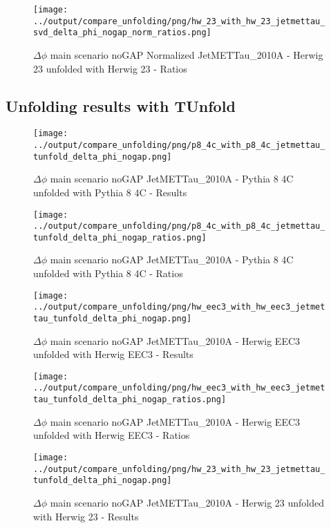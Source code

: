 \documentclass[11pt]{book}
\begin{document}
\begin{figure}[ht]
\centering
\texttt{[image: ../output/compare\_unfolding/png/hw\_23\_with\_hw\_23\_jetmettau\_svd\_delta\_phi\_nogap\_norm\_ratios.png]}
\caption{$\Delta\phi$ main scenario noGAP Normalized JetMETTau\_2010A - Herwig 23 unfolded with Herwig 23 - Ratios}
\label{hw_23_hw_23_jetmettau_svd_delta_phi_nogap_norm_b}
\end{figure}


\clearpage
\subsection{Unfolding results with TUnfold}

\begin{figure}[ht]
\centering
\texttt{[image: ../output/compare\_unfolding/png/p8\_4c\_with\_p8\_4c\_jetmettau\_tunfold\_delta\_phi\_nogap.png]}
\caption{$\Delta\phi$ main scenario noGAP JetMETTau\_2010A - Pythia 8 4C unfolded with Pythia 8 4C - Results}
\label{p8_p8_jetmettau_tunfold_delta_phi_nogap_a}
\end{figure}

\begin{figure}[ht]
\centering
\texttt{[image: ../output/compare\_unfolding/png/p8\_4c\_with\_p8\_4c\_jetmettau\_tunfold\_delta\_phi\_nogap\_ratios.png]}
\caption{$\Delta\phi$ main scenario noGAP JetMETTau\_2010A - Pythia 8 4C unfolded with Pythia 8 4C - Ratios}
\label{p8_p8_jetmettau_tunfold_delta_phi_nogap_b}
\end{figure}

\begin{figure}[ht]
\centering
\texttt{[image: ../output/compare\_unfolding/png/hw\_eec3\_with\_hw\_eec3\_jetmettau\_tunfold\_delta\_phi\_nogap.png]}
\caption{$\Delta\phi$ main scenario noGAP JetMETTau\_2010A - Herwig EEC3 unfolded with Herwig EEC3 - Results}
\label{hw_eec3_hw_eec3_jetmettau_tunfold_delta_phi_nogap_a}
\end{figure}

\begin{figure}[ht]
\centering
\texttt{[image: ../output/compare\_unfolding/png/hw\_eec3\_with\_hw\_eec3\_jetmettau\_tunfold\_delta\_phi\_nogap\_ratios.png]}
\caption{$\Delta\phi$ main scenario noGAP JetMETTau\_2010A - Herwig EEC3 unfolded with Herwig EEC3 - Ratios}
\label{hw_eec3_hw_eec3_jetmettau_tunfold_delta_phi_nogap_b}
\end{figure}

\begin{figure}[ht]
\centering
\texttt{[image: ../output/compare\_unfolding/png/hw\_23\_with\_hw\_23\_jetmettau\_tunfold\_delta\_phi\_nogap.png]}
\caption{$\Delta\phi$ main scenario noGAP JetMETTau\_2010A - Herwig 23 unfolded with Herwig 23 - Results}
\label{hw_23_hw_23_jetmettau_tunfold_delta_phi_nogap_a}
\end{figure}
\end{document}

